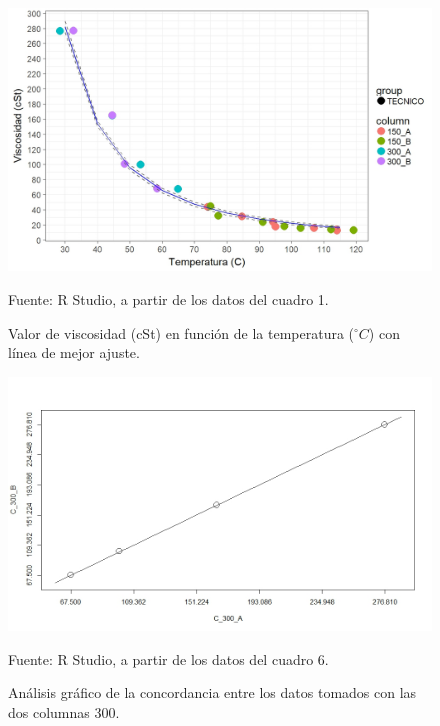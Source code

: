 \documentclass[12pt, letterpaper]{article}
\begin{document}
\begin{landscape}
\begin{figure}[H]
	\centering
	\includegraphics[width=1\columnwidth]{figura_4.png}
	\caption{Valor de viscosidad (cSt) en función de la temperatura ($^{\circ}C$) con línea de mejor ajuste.}
	Fuente: R Studio, a partir de los datos del cuadro 1.
    \label{figura4}
\end{figure}

\begin{figure}[H]
	\centering
	\includegraphics[width=1\columnwidth]{figura_5.png}
	\caption{Análisis gráfico de la concordancia entre los datos tomados con las dos columnas 300.}
	Fuente: R Studio, a partir de los datos del cuadro 6.
    \label{figura5}
\end{figure}


\end{landscape}
\end{document}
